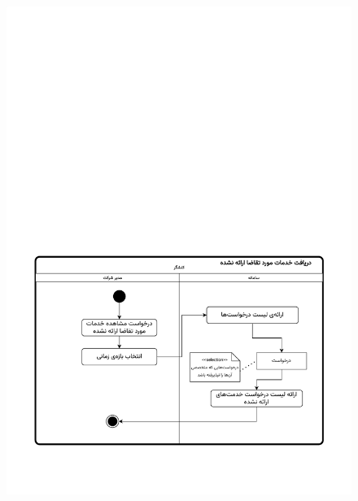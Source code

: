 \begin{figure}[ht!]
	\centering
	\includegraphics[scale=0.8, page=1]{figs/OOD-activity-reqnot.pdf}
\end{figure}
\FloatBarrier
\newpage


